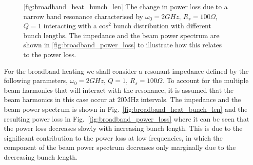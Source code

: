 \begin{figure}
\caption{\ref{fig:broadband_heat_bunch_len} The change in power loss due to a narrow band resonance characterised by $\omega_{0} = 2GHz$, $R_{s} = 100\Omega$, $Q = 1$ interacting with a cos$^{2}$ bunch distribution with different bunch lengths. The impedance and the beam power spectrum are shown in \ref{fig:broadband_power_loss} to illustrate how this relates to the power loss.}
\end{figure}


For the broadband heating we shall consider a resonant impedance defined by the following parameters, $\omega_{0} = 2GHz$, $Q=1$, $R_{s}=100\Omega$. To account for the multiple beam harmonics that will interact with the resonance, it is assumed that the beam harmonics in this case occur at $20$MHz intervals. The impedance and the beam power spectrum is shown in Fig.~\ref{fig:broadband_heat_bunch_len} and the resulting power loss in Fig.~\ref{fig:broadband_power_loss} where it can be seen that the power loss decreases slowly with increasing bunch length. This is due to the significant contribution to the power loss at low frequencies, in which the component of the beam power spectrum decreases only marginally due to the decreasing bunch length.


